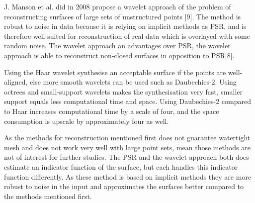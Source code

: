 J. Manson et al. did in 2008 propose a wavelet approach of the problem of reconstructing surfaces of large sets of unstructured points [9]. The method is robust to noise in data because it is relying on implicit methods as PSR, and is therefore well-suited for reconstruction of real data which is overlayed with some random noise. The wavelet approach an advantages over PSR, the wavelet approach is able to reconstruct non-closed surfaces in opposition to PSR[8].

Using the Haar wavelet synthesise an acceptable surface if the points are well-aligned, else more smooth wavelets can be used such as Daubechies-2. Using octrees and small-support wavelets makes the synthesisation very fast, smaller support equals less computational time and space. Using Daubechies-2 compared to Haar increases computational time by a scale of four, and the space consumption is upscale by approximately four as well. 

As the methods for reconstruction mentioned first does not guarantee watertight mesh and does not work very well with large point sets, mean those methods are not of interest for further studies. The PSR and the wavelet approach both does estimate an indicator function of the surface, but each handles this indicator function differently. As these method is based on implicit methods they are more robust to noise in the input and approximates the surfaces better compared to the methods mentioned first.